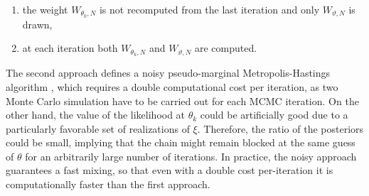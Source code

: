 \begin{enumerate}
	\item the weight $W_{\theta_k,N}$ is not recomputed from the last iteration and only $W_{\vartheta,N}$ is drawn,
	\item at each iteration both $W_{\theta_k,N}$ and $W_{\vartheta,N}$ are computed.
\end{enumerate}
The second approach defines a noisy pseudo-marginal Metropolis-Hastings algorithm \cite{AnR09, MLR16, OBB00}, which requires a double computational cost per iteration, as two Monte Carlo simulation have to be carried out for each MCMC iteration. On the other hand, the value of the likelihood at $\theta_k$ could be artificially good due to a particularly favorable set of realizations of $\xi$. Therefore, the ratio of the posteriors could be small, implying that the chain might remain blocked at the same guess of $\theta$ for an arbitrarily large number of iterations. In practice, the noisy approach guarantees a fast mixing, so that even with a double cost per-iteration it is computationally faster than the first approach. 

